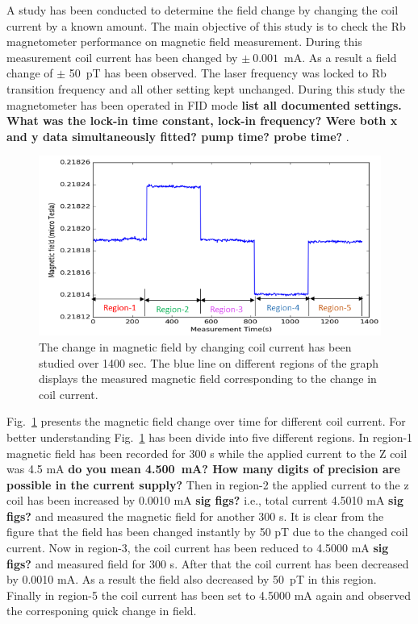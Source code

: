 A study has been conducted to determine the field change by changing
the coil current by a known amount. The main objective of this study
is to check the Rb magnetometer performance on magnetic field
measurement. During this measurement coil current has been changed by
$\pm~ 0.001$~mA. As a result a field change of $\pm$ 50~pT 
has been observed. The laser frequency was locked to Rb transition
frequency and all other setting kept unchanged. During this study the
magnetometer has been operated in FID mode {\bf list all documented
  settings.  What was the lock-in time constant, lock-in frequency?
  Were both x and y data simultaneously fitted? %
  pump time?  probe
  time?%
  }.
\begin{figure}%
\centering\includegraphics[width=0.7\linewidth]{figures/field_change_with_current}
  
\caption{The change in magnetic field  by changing coil current has been studied over 1400 sec. The blue line on different regions of the graph displays the measured magnetic field corresponding to the change in coil current. \label{fig:field-change}}
\end{figure} 
 
Fig.~\ref{fig:field-change} presents the magnetic field change over
time for different coil current. For better understanding
Fig.~\ref{fig:field-change} has been divide into five different
regions. In region-1 magnetic field has been recorded for 300 s while
the applied current to the Z coil was 4.5 mA {\bf do you mean
  4.500~mA?%
  How many digits of precision are possible in the current
  supply? }%
  Then in region-2 the applied current to the z coil has
been increased by 0.0010 mA {\bf sig figs?} i.e., total current 4.5010
mA {\bf sig figs?} and measured the magnetic field for another 300
s. It is clear from the figure that the field has been changed
instantly by 50 pT due to the changed coil current. Now in
region-3, the coil current has been reduced to 4.5000 mA {\bf sig figs?}
and measured field for 300 s. After that the coil current has been
decreased by 0.0010 mA. As a result the field also decreased by
50~pT in this region.  Finally in region-5 the coil current has
been set to 4.5000 mA again and observed the corresponing quick change in
field.

